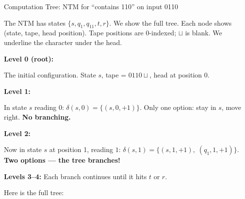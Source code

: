 \begin{examplebox}{Computation Tree: NTM for ``contains 110'' on input 0110}

The NTM has states $\{s, q_1, q_{11}, t, r\}$. We show the full tree. Each
node shows (state, tape, head position). Tape positions are 0-indexed;
$\sqcup$ is blank. We underline the character under the head.

\textbf{Level 0 (root):}

The initial configuration. State $s$, tape = $0110\sqcup$, head at position 0.

\textbf{Level 1:}

In state $s$ reading $0$: $\delta(s, 0) = \{(s, 0, +1)\}$. Only one option: stay in $s$, move right. \textbf{No branching.}

\textbf{Level 2:}

Now in state $s$ at position 1, reading $1$: $\delta(s, 1) = \{(s, 1, +1),\;
(q_1, 1, +1)\}$. \textbf{Two options --- the tree branches!}

\textbf{Levels 3--4:} Each branch continues until it hits $t$ or $r$.

Here is the full tree:


\end{examplebox}
